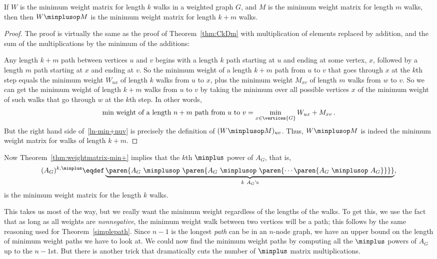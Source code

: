 \begin{editingnotes}
\begin{theorem}\label{thm:weightmatrix-min+}
  If $W$ is the minimum weight matrix for length $k$ walks in a weighted
  graph $G$, and $M$ is the minimum weight matrix for length $m$ walks,
  then then $W\minplusop M$ is the minimum weight matrix for length $k+m$
  walks.
\end{theorem}

\begin{proof}
  The proof is virtually the same as the proof of Theorem~\ref{thm:CkDm}
  with multiplication of elements replaced by addition, and the sum of the
  multiplications by the minimum of the additions:

  Any length $k+m$ path between vertices $u$ and $v$ begins with a length
  $k$ path starting at $u$ and ending at some vertex, $x$, followed by a
  length $m$ path starting at $x$ and ending at $v$.  So the minimum
  weight of a length $k+m$ path from $u$ to $v$ that goes through $x$ at
  the $k$th step equals the minimum weight $W_{ux}$ of length $k$ walks
  from $u$ to $x$, plus the minimum weight $M_{xv}$ of length $m$ walks
  from $w$ to $v$.  So we can get the minimum weight of length $k+m$ walks
  from $u$ to $v$ by taking the minimum over all possible vertices $x$ of
  the minimum weight of such walks that go through $w$ at the $k$th step.
  In other words,
\begin{equation}\label{ln-min+nuv}
\text{min weight of a length $n+m$ path from $u$ to $v$} =
              \min_{x \in \vertices{G}} W_{ux}+M_{xv}\, .
\end{equation}
But the right hand side of~\eqref{ln-min+nuv} is precisely the definition of
$(W\minplusop M)_{uv}$.  Thus, $W\minplusop M$ is indeed the minimum weight
matrix for walks of length $k+m$.
\end{proof}

Now Theorem~\ref{thm:weightmatrix-min+} implies that the $k$th $\minplus$ power
of $A_G$, that is,
\[
(A_G)^{k, \minplus} \eqdef \underbrace{\paren{A_G\ \minplusop\ \paren{A_G\
      \minplusop\ \paren{\cdots \paren{A_G\ \minplusop\ A_G}} }}}_{k\ A_G\text{'s}},
\]
is the minimum weight matrix for the length $k$ walks.

This takes us most of the way, but we really want the minimum weight
regardless of the lengths of the walks.  To get this, we use the fact that
as long as all weights are \emph{nonnegative}, the minimum weight walk
between two vertices will be a path; this follows by the same reasoning
used for Theorem~\ref{simplepath}.  Since $n-1$ is the longest \emph{path}
can be in an $n$-node graph, we have an upper bound on the length of
minimum weight paths we have to look at.  We could now find the minimum
weight paths by computing all the $\minplus$ powers of $A_G$ up to the
$n-1$st.  But there is another trick that dramatically cuts the number of
$\minplus$ matrix multiplications.


\end{editingnotes}
